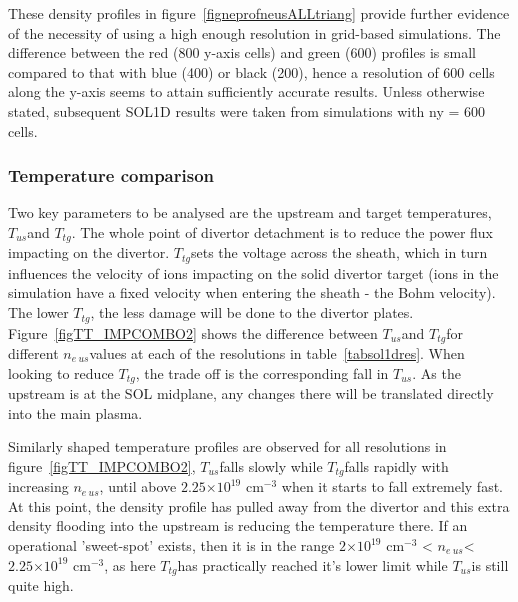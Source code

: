\documentclass[11pt]{article}  %
\providecommand{\e}[1]{\ensuremath{\times 10^{#1}}} %
\providecommand{\neus}{$n_{e~us}$} %
\providecommand{\Tus}{$T_{us}$} %
\providecommand{\Ttg}{$T_{tg}$} %
\begin{document}
These density profiles in figure~\ref{figneprofneusALLtriang} provide further evidence of the necessity of using a high enough resolution in grid-based simulations. The difference between the red (800 y-axis cells) and green (600) profiles is small compared to that with blue (400) or black (200), hence a resolution of 600 cells along the y-axis seems to attain sufficiently accurate results. Unless otherwise stated, subsequent SOL1D results were taken from simulations with ny = 600 cells.

\subsubsection{Temperature comparison}\label{sssectempcomp}
Two key parameters to be analysed are the upstream and target temperatures, \Tus and \Ttg. The whole point of divertor detachment is to reduce the power flux impacting on the divertor. \Ttg sets the voltage across the sheath, which in turn influences the velocity of ions impacting on the solid divertor target (ions in the simulation have a fixed velocity when entering the sheath - the Bohm velocity). The lower \Ttg, the less damage will be done to the divertor plates. Figure~\ref{figTT_IMPCOMBO2} shows the difference between \Tus and \Ttg for different \neus values at each of the resolutions in table~\ref{tabsol1dres}. When looking to reduce \Ttg, the trade off is the corresponding fall in \Tus. As the upstream is at the SOL midplane, any changes there will be translated directly into the main plasma. 

Similarly shaped temperature profiles are observed for all resolutions in figure~\ref{figTT_IMPCOMBO2}, \Tus falls slowly while \Ttg falls rapidly with increasing \neus, until above $2.25\e{19}$ cm$^{-3}$ when it starts to fall extremely fast. At this point, the density profile has pulled away from the divertor and this extra density flooding into the upstream is reducing the temperature there. If an operational 'sweet-spot' exists, then it is in the range $2\e{19}$ cm$^{-3}$ < \neus < $2.25\e{19}$ cm$^{-3}$, as here \Ttg has practically reached it's lower limit while \Tus is still quite high.
\end{document}
